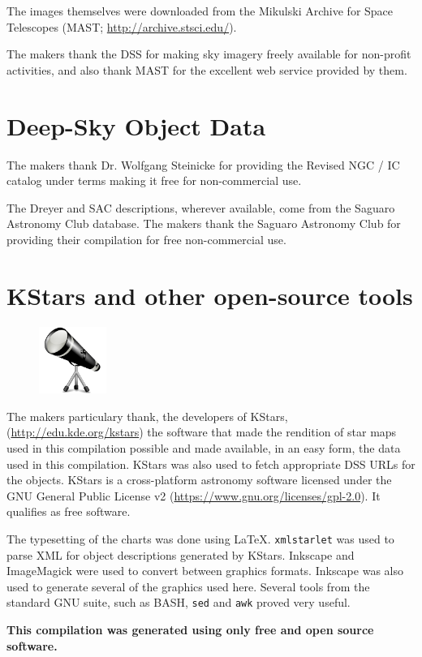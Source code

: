The images themselves were downloaded from the Mikulski Archive for
Space Telescopes (MAST; \url{http://archive.stsci.edu/}).

The makers thank the DSS for making sky imagery freely available for
non-profit activities, and also thank MAST for the excellent web
service provided by them.

\section*{Deep-Sky Object Data}

The makers thank Dr. Wolfgang Steinicke for providing the Revised NGC
/ IC catalog under terms making it free for non-commercial use.

The Dreyer and SAC descriptions, wherever available, come from the
Saguaro Astronomy Club database. The makers thank the Saguaro
Astronomy Club for providing their compilation for free non-commercial
use.
\clearpage
\section*{KStars and other open-source tools}
\begin{figure}
\centering
\includegraphics[width=0.195\textwidth]{kstars.pdf}
\end{figure}
The makers particulary thank, the developers of KStars,
(\url{http://edu.kde.org/kstars}) the software that made the rendition
of star maps used in this compilation possible and made available, in
an easy form, the data used in this compilation. KStars was also used
to fetch appropriate DSS URLs for the objects. KStars is a
cross-platform astronomy software licensed under the GNU General
Public License v2 (\url{https://www.gnu.org/licenses/gpl-2.0}). It
qualifies as free software.

The typesetting of the charts was done using
\LaTeX. \texttt{xmlstarlet} was used to parse XML for object
descriptions generated by KStars. Inkscape and ImageMagick were used
to convert between graphics formats. Inkscape was also used to
generate several of the graphics used here. Several tools from the
standard GNU suite, such as BASH, \texttt{sed} and \texttt{awk} proved
very useful.

\textbf{This compilation was generated using only free and open source
software.}
